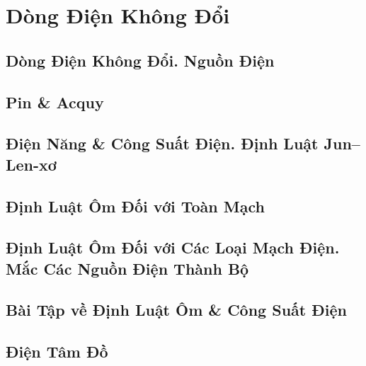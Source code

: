 \documentclass[oneside]{book}
\numberwithin{equation}{section}
\begin{document}
\chapter{Dòng Điện Không Đổi}

\section{Dòng Điện Không Đổi. Nguồn Điện}


\section{Pin \& Acquy}


\section{Điện Năng \& Công Suất Điện. Định Luật Jun--Len-xơ}


\section{Định Luật Ôm Đối với Toàn Mạch}


\section{Định Luật Ôm Đối với Các Loại Mạch Điện. Mắc Các Nguồn Điện Thành Bộ}


\section{Bài Tập về Định Luật Ôm \& Công Suất Điện}


\section{Điện Tâm Đồ}
\end{document}
